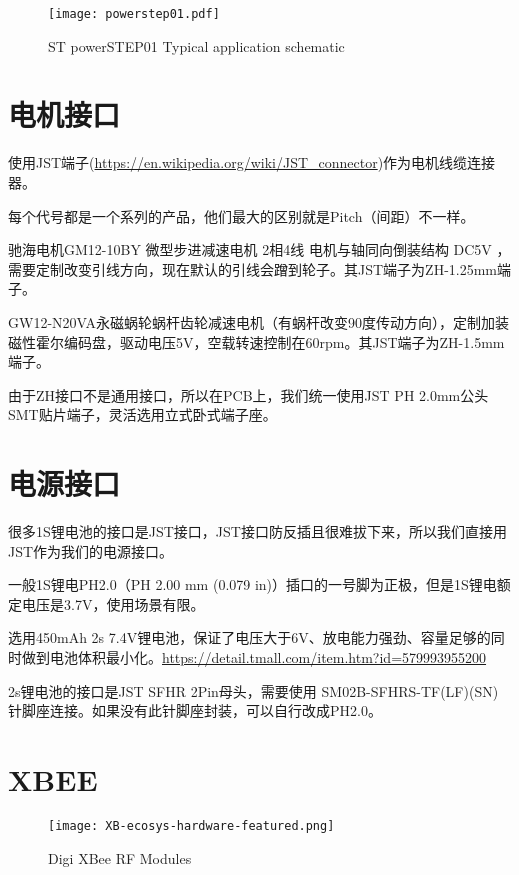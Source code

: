 \begin{figure}[htbp]
    \centering
    \texttt{[image: powerstep01.pdf]}
    \caption{ST powerSTEP01 Typical application schematic}
    \label{fig:powerstep01}
\end{figure}

\section{电机接口}

使用JST端子(\url{https://en.wikipedia.org/wiki/JST_connector})作为电机线缆连接器。

每个代号都是一个系列的产品，他们最大的区别就是Pitch（间距）不一样。

驰海电机GM12-10BY 微型步进减速电机 2相4线 电机与轴同向倒装结构 DC5V ，需要定制改变引线方向，现在默认的引线会蹭到轮子。其JST端子为ZH-1.25mm端子。

GW12-N20VA永磁蜗轮蜗杆齿轮减速电机（有蜗杆改变90度传动方向），定制加装磁性霍尔编码盘，驱动电压5V，空载转速控制在60rpm。其JST端子为ZH-1.5mm端子。

由于ZH接口不是通用接口，所以在PCB上，我们统一使用JST PH 2.0mm公头SMT贴片端子，灵活选用立式卧式端子座。

\section{电源接口}

很多1S锂电池的接口是JST接口，JST接口防反插且很难拔下来，所以我们直接用JST作为我们的电源接口。

一般1S锂电PH2.0（PH 2.00 mm (0.079 in)）插口的一号脚为正极，但是1S锂电额定电压是3.7V，使用场景有限。

选用450mAh 2s 7.4V锂电池，保证了电压大于6V、放电能力强劲、容量足够的同时做到电池体积最小化。\url{https://detail.tmall.com/item.htm?id=579993955200}

2s锂电池的接口是JST SFHR 2Pin母头，需要使用 SM02B-SFHRS-TF(LF)(SN) 针脚座连接。如果没有此针脚座封装，可以自行改成PH2.0。


\section{XBEE}

\begin{figure}[htbp]
    \centering
    \texttt{[image: XB-ecosys-hardware-featured.png]}
    \caption{Digi XBee RF Modules}
    \label{fig:XB}
\end{figure}

